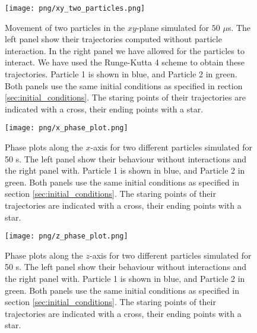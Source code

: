 \begin{figure}
    \texttt{[image: png/xy\_two\_particles.png]}
    \caption{Movement of two particles in the $xy$-plane simulated for $50$ $\mu$s. The left panel show their trajectories computed without particle interaction. In the right panel we have allowed for the particles to interact. We have used the Runge-Kutta 4 scheme to obtain these trajectories. Particle 1 is shown in blue, and Particle 2 in green. Both panels use the same initial conditions as specified in rection \ref{sec:initial_conditions}. The staring points of their trajectories are indicated with a cross, their ending points with a star. }
    \label{fig:xy_two_particles}
\end{figure}

\begin{figure}
    \texttt{[image: png/x\_phase\_plot.png]}
    \caption{Phase plots along the $x$-axis for two different particles simulated for 50 \textmu s. The left panel show their behaviour without interactions and the right panel with. Particle 1 is shown in blue, and Particle 2 in green. Both panels use the same initial conditions as specified in section \ref{sec:initial_conditions}. The staring points of their trajectories are indicated with a cross, their ending points with a star.}
    \label{fig:x_phase_two_particles}
\end{figure} 

\begin{figure}
    \texttt{[image: png/z\_phase\_plot.png]}
    \caption{Phase plots along the $z$-axis for two different particles simulated for 50 \textmu s. The left panel show their behaviour without interactions and the right panel with. Particle 1 is shown in blue, and Particle 2 in green. Both panels use the same initial conditions as specified in section \ref{sec:initial_conditions}. The staring points of their trajectories are indicated with a cross, their ending points with a star.}
    \label{fig:z_phase_two_particles}
\end{figure}
\twocolumngrid





